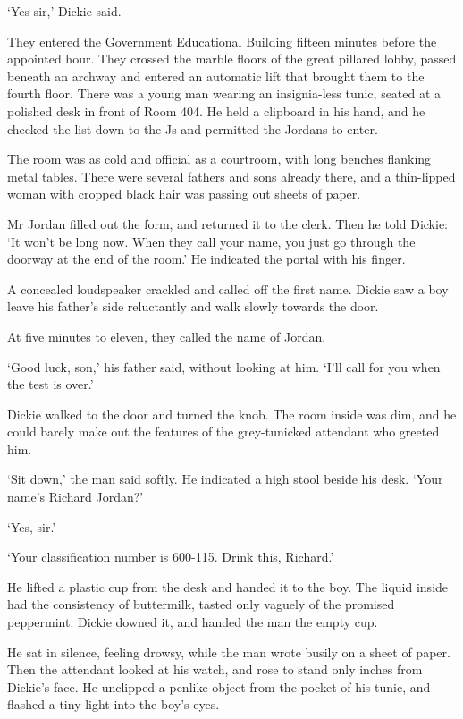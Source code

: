 \documentclass[10pt,a4paper]{article}
\begin{document}
‘Yes sir,’ Dickie said.

They entered the Government Educational Building fifteen minutes before the appointed hour. They crossed the marble floors of the great pillared lobby, passed beneath an archway and entered an automatic lift that brought them to the fourth floor. There was a young man wearing an insignia-less tunic, seated at a polished desk in front of Room 404. He held a clipboard in his hand, and he checked the list down to the Js and permitted the Jordans to enter.

The room was as cold and official as a courtroom, with long benches flanking metal tables. There were several fathers and sons already there, and a thin-lipped woman with cropped black hair was passing out sheets of paper.

Mr Jordan filled out the form, and returned it to the clerk. Then he told Dickie: ‘It won’t be long now. When they call your name, you just go through the doorway at the end of the room.’ He indicated the portal with his finger.

A concealed loudspeaker crackled and called off the first name. Dickie saw a boy leave his father’s side reluctantly and walk slowly towards the door.

At five minutes to eleven, they called the name of Jordan.

‘Good luck, son,’ his father said, without looking at him. ‘I’ll call for you when the test is over.’

Dickie walked to the door and turned the knob. The room inside was dim, and he could barely make out the features of the grey-tunicked attendant who greeted him.

‘Sit down,’ the man said softly. He indicated a high stool beside his desk. ‘Your name’s Richard Jordan?’

‘Yes, sir.’
 
‘Your classification number is 600-115. Drink this, Richard.’

He lifted a plastic cup from the desk and handed it to the boy. The liquid inside had the consistency of buttermilk, tasted only vaguely of the promised peppermint. Dickie downed it, and handed the man the empty cup.

He sat in silence, feeling drowsy, while the man wrote busily on a sheet of paper. Then the attendant looked at his watch, and rose to stand only inches from Dickie’s face. He unclipped a penlike object from the pocket of his tunic, and flashed a tiny light into the boy’s eyes.
\end{document}
